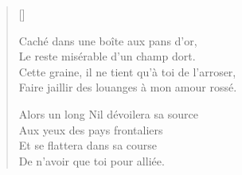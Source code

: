
\settowidth{\versewidth}{Mon esprit est pareil aux champs battus par les vents}
\begin{verse}[\versewidth]



Caché dans une boîte aux pans d'or, \\
Le reste misérable d'un champ dort. \\


Cette graine, il ne tient qu'à toi de l'arroser, \\
Faire jaillir des louanges à mon amour rossé.

Alors un long Nil dévoilera sa source \\
Aux yeux des pays frontaliers \\
Et se flattera dans sa course \\
De n'avoir que toi pour alliée.
\end{verse}

